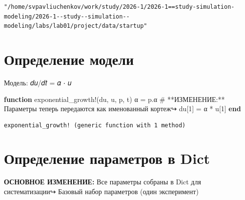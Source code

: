 \documentclass[
  english,
  russian,
  12pt,
  a4paper,
  DIV=11,
  numbers=noendperiod]{scrreprt}
\newenvironment{Shaded}{\begin{snugshade}}{\end{snugshade}}
\newcommand{\CommentTok}[1]{\textcolor[rgb]{0.37,0.37,0.37}{#1}}
\newcommand{\FloatTok}[1]{\textcolor[rgb]{0.68,0.00,0.00}{#1}}
\newcommand{\FunctionTok}[1]{\textcolor[rgb]{0.28,0.35,0.67}{#1}}
\newcommand{\KeywordTok}[1]{\textcolor[rgb]{0.00,0.23,0.31}{\textbf{#1}}}
\newcommand{\NormalTok}[1]{\textcolor[rgb]{0.00,0.23,0.31}{#1}}
\newcommand{\OperatorTok}[1]{\textcolor[rgb]{0.37,0.37,0.37}{#1}}
\begin{document}
\begin{verbatim}
"/home/svpavliuchenkov/work/study/2026-1/2026-1==study-simulation-modeling/2026-1--study--simulation--modeling/labs/lab01/project/data/startup"
\end{verbatim}

\section{Определение
модели}\label{ux43eux43fux440ux435ux434ux435ux43bux435ux43dux438ux435-ux43cux43eux434ux435ux43bux438}

Модель: 𝑑𝑢/𝑑𝑡 = 𝛼 ⋅ 𝑢

\begin{Shaded}
\begin{Highlighting}[]
\KeywordTok{function} \FunctionTok{exponential\_growth!}\NormalTok{(du, u, p, t)}
\NormalTok{α }\OperatorTok{=}\NormalTok{ p.α }\CommentTok{\# **ИЗМЕНЕНИЕ:** Параметры теперь передаются как именованный кортеж↪}
\NormalTok{du[}\FloatTok{1}\NormalTok{] }\OperatorTok{=}\NormalTok{ α }\OperatorTok{*}\NormalTok{ u[}\FloatTok{1}\NormalTok{]}
\KeywordTok{end}
\end{Highlighting}
\end{Shaded}

\begin{verbatim}
exponential_growth! (generic function with 1 method)
\end{verbatim}

\section{Определение параметров в
Dict}\label{ux43eux43fux440ux435ux434ux435ux43bux435ux43dux438ux435-ux43fux430ux440ux430ux43cux435ux442ux440ux43eux432-ux432-dict}

\textbf{ОСНОВНОЕ ИЗМЕНЕНИЕ:} Все параметры собраны в Dict для
систематизации↪ Базовый набор параметров (один эксперимент)
\end{document}
